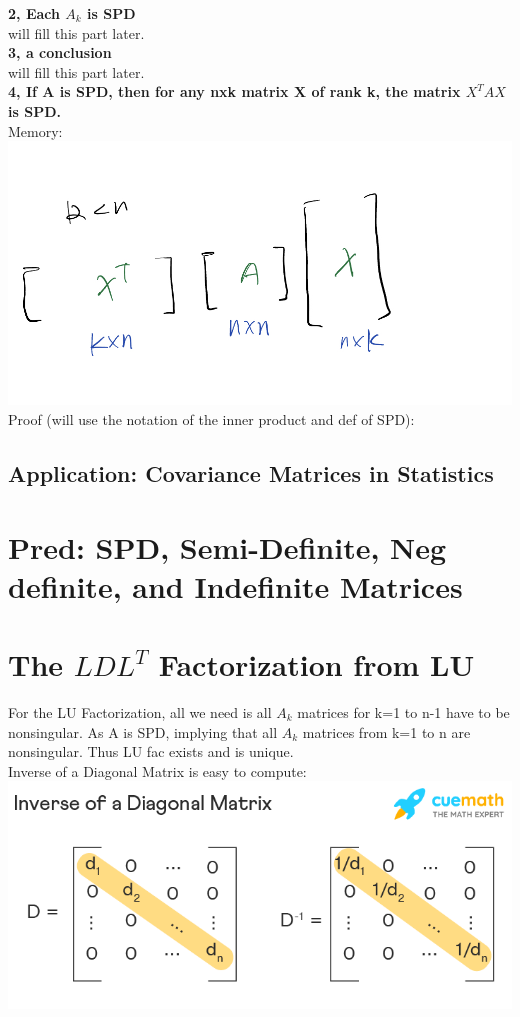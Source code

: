 \documentclass{article}
\begin{document}
\noindent
\textbf{2, Each $A_k$ is SPD}\\
will fill this part later.\\

\noindent
\textbf{3, a conclusion}\\
will fill this part later.\\


\noindent
\textbf{4, If A is SPD, then for any nxk matrix X of rank k, the matrix $X^TAX$ is SPD.}\\
Memory:\\
\includegraphics[width=1\linewidth]{lec6-1.jpg}
Proof (will use the notation of the inner product and def of SPD):\\




\subsection*{Application: Covariance Matrices in Statistics}

\pagebreak
\section{Pred: SPD, Semi-Definite, Neg definite, and Indefinite Matrices}


\pagebreak
\section{The $LDL^T$ Factorization from LU}

For the LU Factorization, all we need is all $A_k$ matrices for k=1 to n-1 have to
be nonsingular. As A is SPD, implying that all $A_k$ matrices from k=1 to n are nonsingular.
Thus LU fac exists and is unique.\\

\noindent
Inverse of a Diagonal Matrix is easy to compute:\\
\includegraphics[width=1\linewidth]{lec6-2.png}
\end{document}
